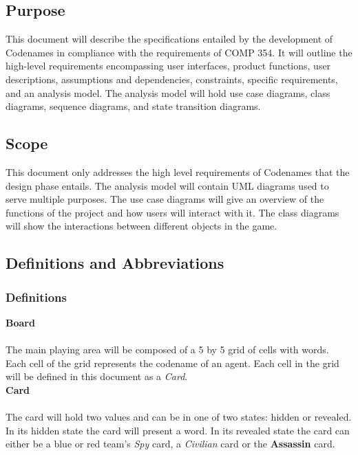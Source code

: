 \documentclass[10pt, a4paper]{article}
\begin{document}
	\subsection{Purpose}
	
	This document will describe the specifications entailed by the development of Codenames in compliance with the requirements of COMP 354. It will outline the high-level requirements encompassing user interfaces, product functions, user descriptions, assumptions and dependencies, constraints, specific requirements, and an analysis model. The analysis model will hold use case diagrams, class diagrams, sequence diagrams, and state transition diagrams.
	
	\subsection{Scope}
	
	This document only addresses the high level requirements of Codenames that the design phase entails. The analysis model will contain UML diagrams used to serve multiple purposes. The use case diagrams will give an overview of the functions of the project and how users will interact with it. The class diagrams will show the interactions between different objects in the game. \\
	

	\subsection{Definitions and Abbreviations}
	
		\subsubsection{Definitions}
	
		\textbf{Board} \\
		\\
		The main playing area will be composed of a 5 by 5 grid of cells with words. Each cell of the grid represents the codename of an agent. Each cell in the grid will be defined in this document as a \textit{Card}.\\
	
		\textbf{Card} \\
		\\
		The card will hold two values and can be in one of two states: hidden or revealed. In its hidden state the card will present a word. In its revealed state the card can either be a blue or red team's \textit{Spy} card, a \textit{Civilian} card or the \textbf{Assassin} card.\\
		
\end{document}
